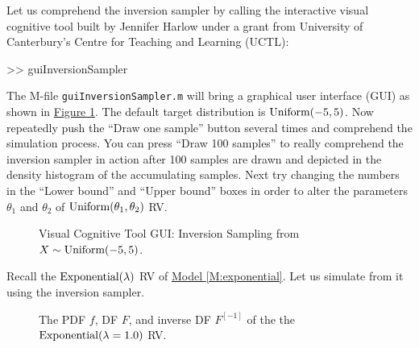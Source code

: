 \begin{labwork}\label{LW:guiInversionSamplerUniform}
Let us comprehend the inversion sampler by calling the interactive visual cognitive tool built by Jennifer Harlow under a grant from University of Canterbury's Centre for Teaching and Learning (UCTL):
\begin{VrbM}
>> guiInversionSampler
\end{VrbM}
The M-file {\tt guiInversionSampler.m} will bring a graphical user interface (GUI) as shown in \hyperref[F:guiInversionSamplerUniform]{Figure \ref*{F:guiInversionSamplerUniform}}.  The default target distribution is $\mbox{{\rm Uniform}}(-5,5)$.  Now repeatedly push the ``Draw one sample'' button several times and comprehend the simulation process.  You can press ``Draw 100 samples'' to really comprehend the inversion sampler in action after 100 samples are drawn and depicted in the density histogram of the accumulating samples.  
Next try changing the numbers in the ``Lower bound'' and ``Upper bound'' boxes in order to alter the parameters $\theta_1$ and $\theta_2$ of $\mbox{{\rm Uniform}}(\theta_1,\theta_2)$ RV.  
\end{labwork}

\begin{figure}[htpb]
\caption{Visual Cognitive Tool GUI: Inversion Sampling from $X \sim \mbox{{\rm Uniform}}(-5,5)$.\label{F:guiInversionSamplerUniform}}
\centering   {}
\end{figure}


Recall the $\mbox{{\rm Exponential}}(\lambda)$ RV of \hyperref[M:exponential]{Model \ref*{M:exponential}}. Let us simulate from it using the inversion sampler.

\begin{figure}[htpb]
\caption{The PDF $f$, DF $F$, and inverse DF $F^{[-1]}$ of the the $\mbox{{\rm Exponential}}(\lambda=1.0)$ RV. \label{F:ExpfFFInv}}
\centering   {}
\end{figure}

